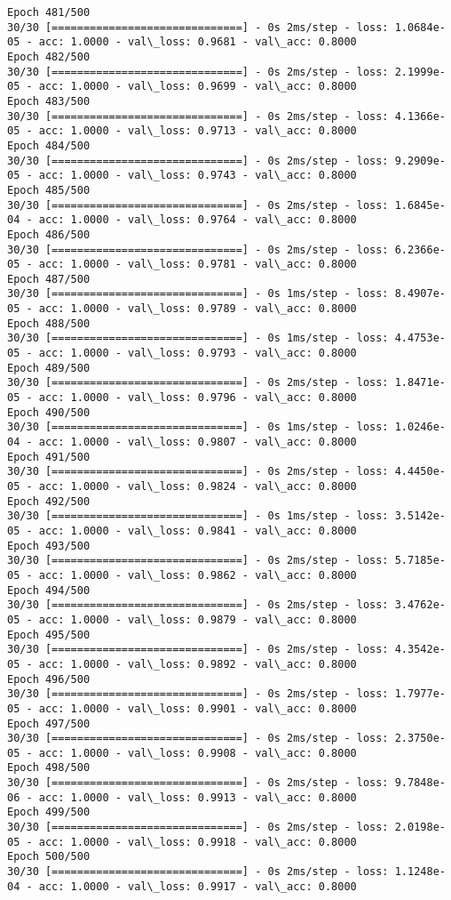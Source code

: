 \documentclass[11pt]{article}
\begin{document}
\begin{Verbatim}[commandchars=\\\{\}]
Epoch 481/500
30/30 [==============================] - 0s 2ms/step - loss: 1.0684e-05 - acc: 1.0000 - val\_loss: 0.9681 - val\_acc: 0.8000
Epoch 482/500
30/30 [==============================] - 0s 2ms/step - loss: 2.1999e-05 - acc: 1.0000 - val\_loss: 0.9699 - val\_acc: 0.8000
Epoch 483/500
30/30 [==============================] - 0s 2ms/step - loss: 4.1366e-05 - acc: 1.0000 - val\_loss: 0.9713 - val\_acc: 0.8000
Epoch 484/500
30/30 [==============================] - 0s 2ms/step - loss: 9.2909e-05 - acc: 1.0000 - val\_loss: 0.9743 - val\_acc: 0.8000
Epoch 485/500
30/30 [==============================] - 0s 2ms/step - loss: 1.6845e-04 - acc: 1.0000 - val\_loss: 0.9764 - val\_acc: 0.8000
Epoch 486/500
30/30 [==============================] - 0s 2ms/step - loss: 6.2366e-05 - acc: 1.0000 - val\_loss: 0.9781 - val\_acc: 0.8000
Epoch 487/500
30/30 [==============================] - 0s 1ms/step - loss: 8.4907e-05 - acc: 1.0000 - val\_loss: 0.9789 - val\_acc: 0.8000
Epoch 488/500
30/30 [==============================] - 0s 1ms/step - loss: 4.4753e-05 - acc: 1.0000 - val\_loss: 0.9793 - val\_acc: 0.8000
Epoch 489/500
30/30 [==============================] - 0s 2ms/step - loss: 1.8471e-05 - acc: 1.0000 - val\_loss: 0.9796 - val\_acc: 0.8000
Epoch 490/500
30/30 [==============================] - 0s 1ms/step - loss: 1.0246e-04 - acc: 1.0000 - val\_loss: 0.9807 - val\_acc: 0.8000
Epoch 491/500
30/30 [==============================] - 0s 2ms/step - loss: 4.4450e-05 - acc: 1.0000 - val\_loss: 0.9824 - val\_acc: 0.8000
Epoch 492/500
30/30 [==============================] - 0s 1ms/step - loss: 3.5142e-05 - acc: 1.0000 - val\_loss: 0.9841 - val\_acc: 0.8000
Epoch 493/500
30/30 [==============================] - 0s 2ms/step - loss: 5.7185e-05 - acc: 1.0000 - val\_loss: 0.9862 - val\_acc: 0.8000
Epoch 494/500
30/30 [==============================] - 0s 2ms/step - loss: 3.4762e-05 - acc: 1.0000 - val\_loss: 0.9879 - val\_acc: 0.8000
Epoch 495/500
30/30 [==============================] - 0s 2ms/step - loss: 4.3542e-05 - acc: 1.0000 - val\_loss: 0.9892 - val\_acc: 0.8000
Epoch 496/500
30/30 [==============================] - 0s 2ms/step - loss: 1.7977e-05 - acc: 1.0000 - val\_loss: 0.9901 - val\_acc: 0.8000
Epoch 497/500
30/30 [==============================] - 0s 2ms/step - loss: 2.3750e-05 - acc: 1.0000 - val\_loss: 0.9908 - val\_acc: 0.8000
Epoch 498/500
30/30 [==============================] - 0s 2ms/step - loss: 9.7848e-06 - acc: 1.0000 - val\_loss: 0.9913 - val\_acc: 0.8000
Epoch 499/500
30/30 [==============================] - 0s 2ms/step - loss: 2.0198e-05 - acc: 1.0000 - val\_loss: 0.9918 - val\_acc: 0.8000
Epoch 500/500
30/30 [==============================] - 0s 2ms/step - loss: 1.1248e-04 - acc: 1.0000 - val\_loss: 0.9917 - val\_acc: 0.8000

    \end{Verbatim}
\end{document}
